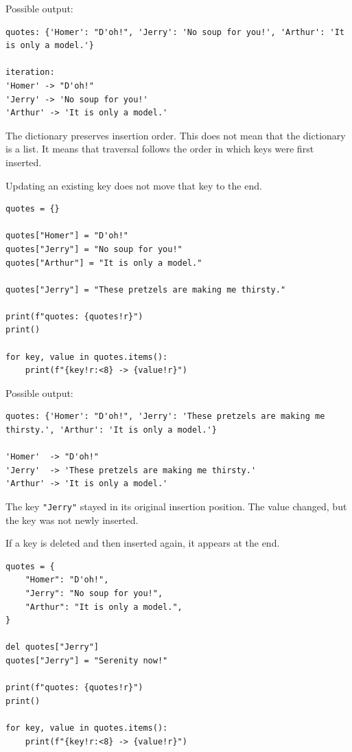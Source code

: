Possible output:

\begin{verbatim}
quotes: {'Homer': "D'oh!", 'Jerry': 'No soup for you!', 'Arthur': 'It is only a model.'}

iteration:
'Homer' -> "D'oh!"
'Jerry' -> 'No soup for you!'
'Arthur' -> 'It is only a model.'
\end{verbatim}

The dictionary preserves insertion order. This does not mean that the dictionary is a list. It means that traversal follows the order in which keys were first inserted.

Updating an existing key does not move that key to the end.

\begin{verbatim}
quotes = {}

quotes["Homer"] = "D'oh!"
quotes["Jerry"] = "No soup for you!"
quotes["Arthur"] = "It is only a model."

quotes["Jerry"] = "These pretzels are making me thirsty."

print(f"quotes: {quotes!r}")
print()

for key, value in quotes.items():
    print(f"{key!r:<8} -> {value!r}")
\end{verbatim}

Possible output:

\begin{verbatim}
quotes: {'Homer': "D'oh!", 'Jerry': 'These pretzels are making me thirsty.', 'Arthur': 'It is only a model.'}

'Homer'  -> "D'oh!"
'Jerry'  -> 'These pretzels are making me thirsty.'
'Arthur' -> 'It is only a model.'
\end{verbatim}

The key \texttt{"Jerry"} stayed in its original insertion position. The value changed, but the key was not newly inserted.

If a key is deleted and then inserted again, it appears at the end.

\begin{verbatim}
quotes = {
    "Homer": "D'oh!",
    "Jerry": "No soup for you!",
    "Arthur": "It is only a model.",
}

del quotes["Jerry"]
quotes["Jerry"] = "Serenity now!"

print(f"quotes: {quotes!r}")
print()

for key, value in quotes.items():
    print(f"{key!r:<8} -> {value!r}")
\end{verbatim}


